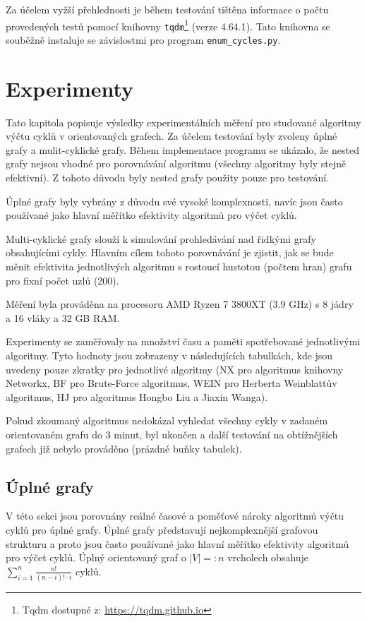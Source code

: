         Za účelem vyžší přehlednosti je během testování tištěna informace o počtu provedených testů pomocí knihovny \texttt{tqdm}\footnote{Tqdm dostupné z: \url{https://tqdm.github.io}} (verze 4.64.1). Tato knihovna se souběžně instaluje se závislostmi pro program \texttt{enum\_cycles.py}.


\chapter{Experimenty}
    \label{chapter:Experiments}
    Tato kapitola popisuje výsledky experimentálních měření pro studované algoritmy výčtu cyklů v orientovaných grafech. Za účelem testování byly zvoleny úplné grafy a mulit-cyklické grafy. Během implementace programu se ukázalo, že nested grafy nejsou vhodné pro porovnávání algoritmu (všechny algoritmy byly stejně efektivní). Z tohoto důvodu byly nested grafy použity pouze pro testování.

    Úplné grafy byly vybrány z důvodu své vysoké komplexnosti, navíc jsou často používané jako hlavní měřítko efektivity algoritmů pro výčet cyklů.

    Multi-cyklické grafy slouží k simulování prohledávání nad řidkými grafy obsahujícími cykly. Hlavním cílem tohoto porovnávání je zjistit, jak se bude měnit efektivita jednotlivých algoritmu s rostoucí hustotou (počtem hran) grafu pro fixní počet uzlů (200).

    Měření byla prováděna na procesoru AMD Ryzen 7 3800XT (3.9 GHz) s 8 jádry a 16 vláky a 32 GB RAM.

    Experimenty se zaměřovaly na množství času a paměti spotřebované jednotlivými algoritmy. Tyto hodnoty jsou zobrazeny v následujících tabulkách, kde jsou uvedeny pouze zkratky pro jednotlivé algoritmy (NX pro algoritmus knihovny Networkx, BF pro Brute-Force algoritmus, WEIN pro Herberta Weinblattův algoritmus, HJ pro algoritmus Hongbo Liu a Jiaxin Wanga).

    Pokud zkoumaný algoritmus nedokázal vyhledat všechny cykly v zadaném orientovaném grafu do 3 minut, byl ukončen a další testování na obtížnějších grafech již nebylo prováděno (prázdné buňky tabulek).

    \section{Úplné grafy}
        V této sekci jsou porovnány reálné časové a poměťové nároky algoritmů výčtu cyklů pro úplné grafy. Úplné grafy představují nejkomplexnější grafovou strukturu a proto jsou často používané jako hlavní měřítko efektivity algoritmů pro výčet cyklů. Úplný orientovaný graf o $|V| =: n$ vrcholech obsahuje $\sum_{i=1}^n \frac{n!}{(n-i)! \cdot i}$ cyklů.

